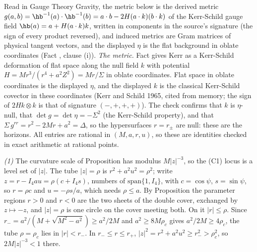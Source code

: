 Read in Gauge Theory Gravity, the metric below is the derived metric $g(a,b) = \hb^{-1}(a)\cdot\hb^{-1}(b) = a\cdot b - 2H(a\cdot k)(b\cdot k)$ of the Kerr-Schild gauge field $\hb(a) = a + H(a\cdot k)k$, written in components in the source's signature (the sign of every product reversed), and induced metrics are Gram matrices of physical tangent vectors, and the displayed $\eta$ is the flat background in oblate coordinates (Fact , clause (i)). \emph{The metric.} Fact  gives Kerr as a Kerr-Schild deformation of flat space along the null field $k$ with potential $H = Mr^3/(r^4 + a^2Z^2) = Mr/\Sigma$ in oblate coordinates. Flat space in oblate coordinates is the displayed $\eta$, and the displayed $k$ is the classical Kerr-Schild covector in these coordinates (Kerr and Schild 1965, cited from memory; the sign of $2Hk\otimes k$ is that of signature $(-,+,+,+)$). The check confirms that $k$ is $\eta$-null, that $\det g = \det\eta = -\Sigma^2$ (the Kerr-Schild property), and that $\Sigma\,g^{rr} = r^2 - 2Mr + a^2 = \Delta$, so the hypersurfaces $r = r_\pm$ are null: these are the horizons. All entries are rational in $(M, a, r, u)$, so these are identities checked in exact arithmetic at rational points.

\emph{(1)} The curvature scale of Proposition  has modulus $M|z|^{-3}$, so the (C1) locus is a level set of $|z|$. The tube $|z| = \rho$ is $r^2 + a^2u^2 = \rho^2$; write $z = r - I_4au = \rho(c + I_4s)$, numbers of $\mathrm{span}\{1, I_4\}$, with $c = \cos\psi$, $s = \sin\psi$, so $r = \rho c$ and $u = -\rho s/a$, which needs $\rho \le a$. By Proposition  the parameter regions $r > 0$ and $r < 0$ are the two sheets of the double cover, exchanged by $z \mapsto -z$, and $|z| = \rho$ is one circle on the cover meeting both. On it $|r| \le \rho$. Since $r_- = a^2/(M + \sqrt{M^2 - a^2}) \ge a^2/2M$ and $a^2 \ge 8M\rho_c$ gives $a^2/2M \ge 4\rho_c$, the tube $\rho = \rho_c$ lies in $|r| < r_-$. In $r_- \le r \le r_+$, $|z|^2 = r^2 + a^2u^2 \ge r_-^2 > \rho_c^2$, so $2M|z|^{-3} < 1$ there.

